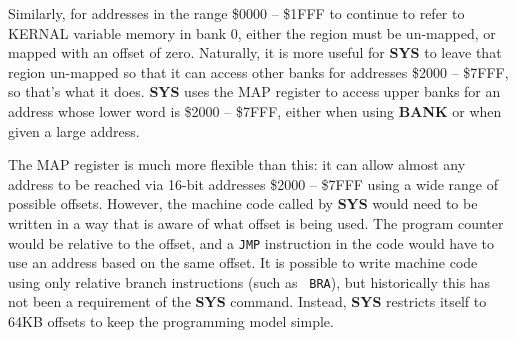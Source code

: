 Similarly, for addresses in the range \$0000 -- \$1FFF to continue to refer to
KERNAL variable memory in bank 0, either the region must be un-mapped, or
mapped with an offset of zero. Naturally, it is more useful for {\bf SYS} to
leave that region un-mapped so that it can access other banks for addresses
\$2000 -- \$7FFF, so that's what it does. {\bf SYS} uses the MAP register to
access upper banks for an address whose lower word is \$2000 -- \$7FFF, either
when using {\bf BANK} or when given a large address.

The MAP register is much more flexible than this: it can allow almost any
address to be reached via 16-bit addresses \$2000 -- \$7FFF using a wide range
of possible offsets. However, the machine code called by {\bf SYS} would need
to be written in a way that is aware of what offset is being used. The program
counter would be relative to the offset, and a {\tt JMP} instruction in the
code would have to use an address based on the same offset. It is possible to
write machine code using only relative branch instructions (such as {\tt
BRA}), but historically this has not been a requirement of the {\bf SYS}
command. Instead, {\bf SYS} restricts itself to 64KB offsets to keep the
programming model simple.
